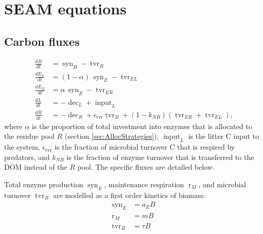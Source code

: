 \section{\hspace*{-7mm}  SEAM equations \label{app:SEAM}
}    

\subsection{Carbon fluxes}
\begin{subequations}
\label{eq:SEAM}
\begin{align}
\frac{dB}{dt} &= \operatorname{syn}_B - \operatorname{tvr}_B \\
\frac{dE_L}{dt} &= (1 - \alpha)  \, \operatorname{syn}_E -\operatorname{tvr}_{EL}\\
\frac{dE_R}{dt} &= \alpha \, \operatorname{syn}_E - \operatorname{tvr}_{ER} \\
\frac{dL}{dt} &=  - \operatorname{dec}_L + \operatorname{input}_L
\\
\frac{dR}{dt} &=  - \operatorname{dec}_R +
\epsilon_{\operatorname{tvr}}  \operatorname{tvr}_B + (1 -k_{NB})
(\operatorname{tvr}_{ER} + \operatorname{tvr}_{EL})
\text{,} 
\end{align}
\end{subequations}
where $\alpha$ is the proportion of total investment into enzymes
that is allocated to the residue pool $R$ (section
\ref{sec:AllocStrategies}), $\operatorname{input}_L$
is the litter C input to the system, $\epsilon_{\operatorname{tvr}}$ is the
fraction of microbial turnover C that is respired by predators, and $k_{NB}$ is the fraction of enzyme turnover
that is transferred to the DOM instead of the $R$ pool.
The specific fluxes are detailed below.

Total enzyme production $\operatorname{syn}_E$, maintenance respiration
$\operatorname{r}_{M}$, and microbial turnover $\operatorname{tvr}_B$ are
modelled as a first order kinetics of biomass:
\begin{subequations}
\begin{align}
\label{eq:synE} \operatorname{syn}_E &= a_E B \\
\label{eq:rM} \operatorname{r}_{M} &= m B \\
\label{eq:tvrB} \operatorname{tvr}_B &= \tau B 
\end{align}
\end{subequations}

